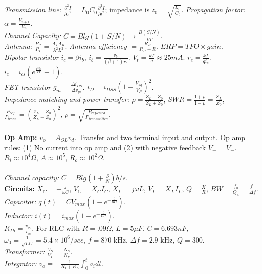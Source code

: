 \emph{Transmission line:}
${\frac {\partial^2 I} {{\partial x}^2}} = L_0 C_0 {\frac {\partial^2 I} {{\partial t}^2}}$;
impedance is $z_0 = {\sqrt {\frac {L_0} {C_0}}}$.
\emph{Propagation factor:}
$\alpha= {\frac {V_{n+1}} {V_n}}$.  \\
\emph{Channel Capacity:} $C= B lg(1+S/N) \rightarrow {\frac {B (S/N)} {kT}}$. \\
\emph{Antenna:} ${\frac {P_R} {P_T}}= {\frac {A_T A_R} {\lambda^2 L^2}}$.
\emph{Antenna efficiency} $= {\frac {R_R} {R_R+R}}$.
$ERP= TPO \times gain$.\\
\emph{Bipolar transistor} $i_c= \beta i_b$, $i_b = {\frac {v_b}{(\beta + 1)r_e}}$. 
$V_t= {\frac {kT}q} \approx 25mA$.  $r_e= {\frac {kT}{q i_c}}$.
$i_c= i_{cs} (e^{\frac {qv_{be}} {kT}} -1)$.
\\
\emph{FET transistor} $g_m = {\frac {\Delta i_{DS}} {\Delta v_{gs}}}$.  $i_D = i_{DSS} (1-{\frac {V_{sg}} {V_P}})^2$.
\\
\emph{Impedance matching and power transfer:}
$\rho={\frac {Z_L-Z_0} {Z_L+Z_0}}$, 
$SWR= {\frac {1+\rho} {1-\rho}}= {\frac {Z_L}{Z_0}}$,
${\frac {P_{ref}} {P_{trans}}}= ({\frac {Z_L-Z_0} {Z_L+Z_0}})^2$,
$\rho= {\sqrt {\frac {P_{reflected}} {P_{transmitted}}}}$.
\\
\\
{\bf Op Amp:} $ v_o= A_{OL}v_d$.  Transfer and two terminal input and output.
Op amp rules: (1) No current into op amp and
(2) with negative feedback $V_+ = V_-$.
$R_i \approx 10^4 \Omega$, $A \approx 10^5$, $R_o \approx 10^2 \Omega$.    
\\
\\
\emph{Channel capacity:} $C= B lg(1+{\frac S N}) b/s$.
\\
{\bf Circuits:}
$X_C= -{\frac j {\omega C}}$, $V_C= X_C I_C$,
$X_L=  j \omega L$, $V_L= X_L I_L$,
$Q= {\frac X R}$, $BW= {\frac {f_0} {Q_u}} =
{\frac {f_0} {\Delta f}}$. \\
\emph{Capacitor:} $q(t)= C V_{max} (1-e^{- {\frac t {RC}}})$. \\
\emph{Inductor:} $i(t)= i_{max} (1-e^{- {\frac t {LR}}})$. \\
$R_{Th}= {\frac {v_{oc}} {i_{sc}}}$.
For RLC with $R=.09 \Omega$, $L= 5 \mu F$, $C= 6.693 nF$,
$\omega_0 = {\frac 1 {\sqrt {LC}}}= 5.4 \times 10^6 /sec$, $f= 870$ kHz, $\Delta f= 2.9$ kHz,
$Q= 300$.   \\
\emph{Transformer:} ${\frac {V_S}{V_P}}= {\frac {N_S}{N_P}}$. \\
\emph{Integrator:} $v_o= - {\frac 1 {R_1+R_L}} \int_0^t v_i dt$. \\

